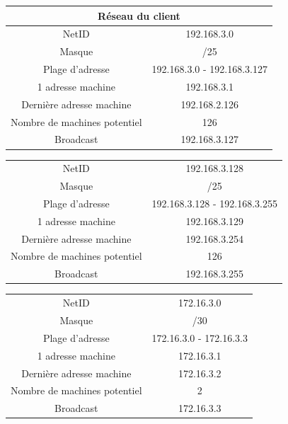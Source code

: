 \documentclass[a4paper,12pt]{article}
\begin{document}
\begin{center}
\begin{tabular}{|c|c|}
  \hline
 \multicolumn{2}{|c|}{\cellcolor{bleup}Réseau du client} \\
  \hline
  NetID & 192.168.3.0 \\
  Masque & /25  \\
  Plage d'adresse & 192.168.3.0 - 192.168.3.127\\
  1\up{ere} adresse machine & 192.168.3.1\\
  Dernière adresse machine & 192.168.2.126\\
  Nombre de machines potentiel & 126\\
  Broadcast & 192.168.3.127\\
  \hline
\end{tabular}
\end{center}

\begin{center}
\begin{tabular}{|c|c|}
  \hline
  \rowcolor{orangec} \multicolumn{2}{|c|}{\cellcolor{bleup}Réseau du seveur (DMZ)} \\
  \hline
  NetID & 192.168.3.128 \\
  Masque & /25  \\
  Plage d'adresse & 192.168.3.128 - 192.168.3.255\\
  1\up{ere} adresse machine & 192.168.3.129\\
  Dernière adresse machine& 192.168.3.254\\
  Nombre de machines potentiel & 126\\
  Broadcast & 192.168.3.255\\
  \hline
\end{tabular}
\end{center}

\begin{center}
\begin{tabular}{|c|c|}
  \hline
  \rowcolor{orangec} \multicolumn{2}{|c|}{\cellcolor{bleup}Réseau de transport} \\
  \hline
  NetID & 172.16.3.0 \\
  Masque & /30  \\
  Plage d'adresse & 172.16.3.0 - 172.16.3.3\\
  1\up{ere} adresse machine & 172.16.3.1\\
  Dernière adresse machine&  172.16.3.2\\
  Nombre de machines potentiel & 2\\
  Broadcast & 172.16.3.3\\
  \hline
\end{tabular}
\end{center}
\end{document}
